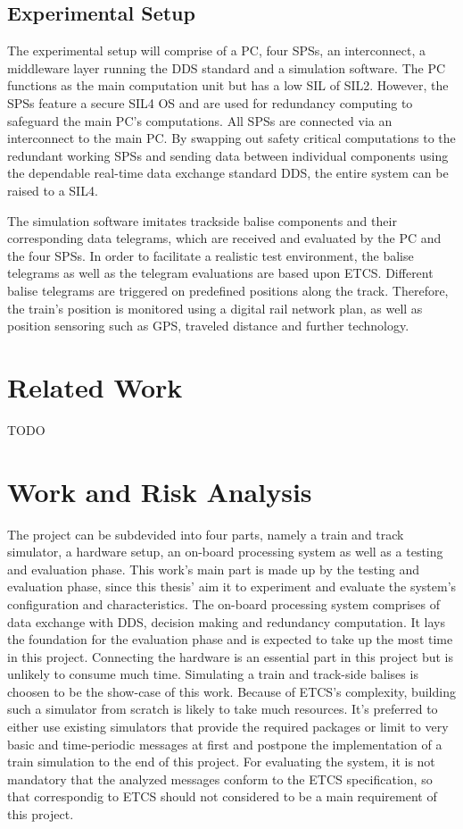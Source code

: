 \documentclass[a4paper, 12pt]{scrartcl}
\begin{document}
\subsection*{Experimental Setup}
The experimental setup will comprise of a PC, four \acp{SPS}, an interconnect, a middleware layer running the \ac{DDS} standard and a simulation software.
The PC functions as the main computation unit but has a low \ac{SIL} of \ac{SIL}2.
However, the \acp{SPS} feature a secure \ac{SIL}4 \ac{OS} and are used for redundancy computing to safeguard the main PC's computations.
All \acp{SPS} are connected via an interconnect to the main PC.
By swapping out safety critical computations to the redundant working \acp{SPS} and sending data between individual components using the dependable real-time data exchange standard \ac{DDS}, the entire system can be raised to a \ac{SIL}4.

The simulation software imitates trackside balise components and their corresponding data telegrams, which are received and evaluated by the PC and the four \acp{SPS}.
In order to facilitate a realistic test environment, the balise telegrams as well as the telegram evaluations are based upon \ac{ETCS}.
Different balise telegrams are triggered on predefined positions along the track.
Therefore, the train's position is monitored using a digital rail network plan, as well as position sensoring such as GPS, traveled distance and further technology.

\section*{Related Work}
TODO



\section*{Work and Risk Analysis}

The project can be subdevided into four parts, namely a train and track simulator, a hardware setup, an on-board processing system as well as a testing and evaluation phase.
This work's main part is made up by the testing and evaluation phase, since this thesis' aim it to experiment and evaluate the system's configuration and characteristics.
The on-board processing system comprises of data exchange with \ac{DDS}, decision making and redundancy computation.
It lays the foundation for the evaluation phase and is expected to take up the most time in this project.
Connecting the hardware is an essential part in this project but is unlikely to consume much time.
Simulating a train and track-side balises is choosen to be the show-case of this work.
Because of \ac{ETCS}'s complexity, building such a simulator from scratch is likely to take much resources.
It's preferred to either use existing simulators that provide the required packages or limit to very basic and time-periodic messages at first and postpone the implementation of a train simulation to the end of this project.
For evaluating the system, it is not mandatory that the analyzed messages conform to the \ac{ETCS} specification, so that correspondig to \ac{ETCS} should not considered to be a main requirement of this project.
\end{document}
